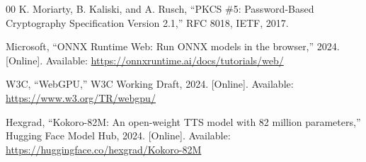 \documentclass[runningheads]{llncs}
\begin{document}
\begin{thebibliography}{00}
 K. Moriarty, B. Kaliski, and A. Rusch, ``PKCS \#5:
Password-Based Cryptography Specification Version 2.1,'' RFC 8018, IETF, 2017.

 Microsoft, ``ONNX Runtime Web: Run ONNX models in the
browser,'' 2024. [Online]. Available: \url{https://onnxruntime.ai/docs/tutorials/web/}

 W3C, ``WebGPU,'' W3C Working Draft, 2024. [Online].
Available: \url{https://www.w3.org/TR/webgpu/}

 Hexgrad, ``Kokoro-82M: An open-weight TTS model with 82
million parameters,'' Hugging Face Model Hub, 2024. [Online]. Available:
\url{https://huggingface.co/hexgrad/Kokoro-82M}

\end{thebibliography}
\end{document}
